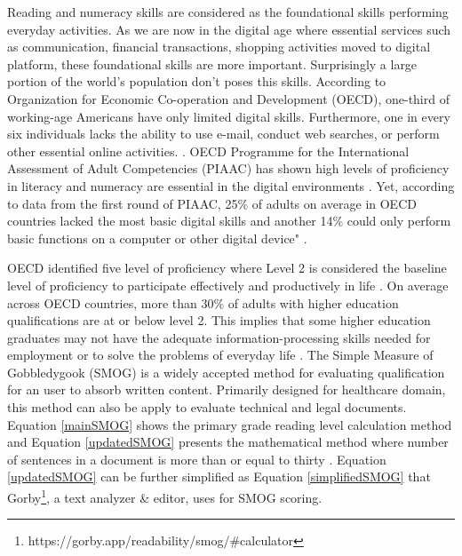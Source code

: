 \documentclass[manuscript,review,anonymous]{acmart}
\begin{document}
	Reading and numeracy skills are considered as the foundational skills performing everyday activities. As we are now in the digital age where essential services such as communication, financial transactions, shopping activities moved to digital platform, these foundational skills are more important. Surprisingly a large portion of the world's population don't poses this skills. According to Organization for Economic Co-operation and Development (OECD), one-third of working-age Americans have only limited digital skills. Furthermore, one in every six individuals lacks the ability to use e-mail, conduct web searches, or perform other essential online activities. \cite{ezell2021assessing}.  OECD Programme for the International Assessment of Adult Competencies (PIAAC) has shown high levels of proficiency in literacy and numeracy are essential in the digital environments \cite{OECD_Digital_literacy}. Yet, according to data from the first round of PIAAC, 25\% of adults on average in OECD countries lacked the most basic digital skills and another 14\% could only perform basic functions on a computer or other digital device" \cite{OECD_Digital_literacy}.

	OECD identified five level of proficiency where Level 2 is considered the baseline level of proficiency to participate effectively and productively in life \cite{OECD} \cite{OECD_Skills}. On average	across OECD countries, more than 30\% of adults with higher education qualifications are at or below level 2. This implies that some higher education graduates may not have the adequate information-processing skills needed for employment or to solve the problems of everyday life \cite{OECD}. The Simple Measure of Gobbledygook (SMOG) is a widely accepted method for evaluating qualification for an user to absorb written content. Primarily designed for healthcare domain, this method can also be apply to evaluate technical and legal documents. Equation \ref{mainSMOG} shows the primary grade reading level calculation method and Equation \ref{updatedSMOG} presents the mathematical method where number of sentences in a document is more than or equal to thirty \cite{mclaughlin1969smog} \cite{SOL}. Equation \ref{updatedSMOG} can be further simplified as Equation \ref{simplifiedSMOG} that Gorby\footnote{https://gorby.app/readability/smog/\#calculator}, a text analyzer \& editor, uses for SMOG scoring.
\end{document}
